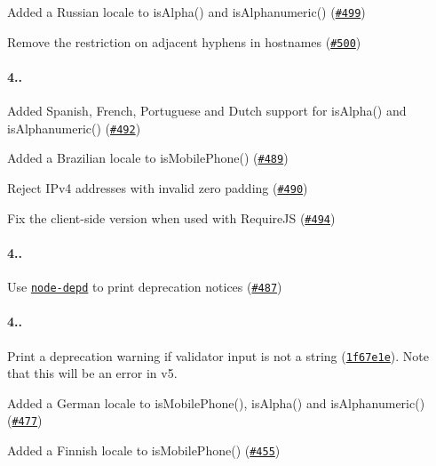 
\begin{DoxyItemize}
\item Added a Russian locale to {\ttfamily is\+Alpha()} and {\ttfamily is\+Alphanumeric()} (\href{https://github.com/chriso/validator.js/pull/499}{\tt \#499})
\item Remove the restriction on adjacent hyphens in hostnames (\href{https://github.com/chriso/validator.js/issues/500}{\tt \#500})
\end{DoxyItemize}

\paragraph*{4..}


\begin{DoxyItemize}
\item Added Spanish, French, Portuguese and Dutch support for {\ttfamily is\+Alpha()} and {\ttfamily is\+Alphanumeric()} (\href{https://github.com/chriso/validator.js/pull/492}{\tt \#492})
\item Added a Brazilian locale to {\ttfamily is\+Mobile\+Phone()} (\href{https://github.com/chriso/validator.js/pull/489}{\tt \#489})
\item Reject I\+Pv4 addresses with invalid zero padding (\href{https://github.com/chriso/validator.js/pull/490}{\tt \#490})
\item Fix the client-\/side version when used with Require\+JS (\href{https://github.com/chriso/validator.js/issues/494}{\tt \#494})
\end{DoxyItemize}

\paragraph*{4..}


\begin{DoxyItemize}
\item Use \href{https://github.com/dougwilson/nodejs-depd}{\tt node-\/depd} to print deprecation notices (\href{https://github.com/chriso/validator.js/issues/487}{\tt \#487})
\end{DoxyItemize}

\paragraph*{4..}


\begin{DoxyItemize}
\item Print a deprecation warning if validator input is not a string (\href{https://github.com/chriso/validator.js/commit/1f67e1e15198c0ae735151290dc8dc2bf14da254}{\tt 1f67e1e}). Note that this will be an error in v5.
\item Added a German locale to {\ttfamily is\+Mobile\+Phone()}, {\ttfamily is\+Alpha()} and {\ttfamily is\+Alphanumeric()} (\href{https://github.com/chriso/validator.js/pull/477}{\tt \#477})
\item Added a Finnish locale to {\ttfamily is\+Mobile\+Phone()} (\href{https://github.com/chriso/validator.js/pull/455}{\tt \#455})
\end{DoxyItemize}

